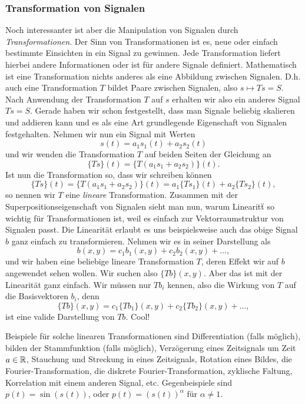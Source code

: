 \subsubsection{Transformation von Signalen}
%
Noch interessanter ist aber die Manipulation von Signalen durch \emph{Transformationen}.
Der Sinn von Transformationen ist es, neue oder einfach bestimmte Einsichten in ein Signal zu gewinnen. 
Jede Transformation liefert hierbei andere Informationen oder ist f\"ur andere Signale definiert.
Mathematisch ist eine Transformation nichts anderes als eine Abbildung zwischen Signalen.
D.h. auch eine Transformation $T$ bildet Paare zwischen Signalen, also $s \mapsto Ts = S$.
Nach Anwendung der Transformation $T$ auf $s$ erhalten wir also ein anderes Signal $Ts = S$.
Gerade haben wir schon festgestellt, dass man Signale beliebig skalieren und addieren kann und es als eine Art grundlegende Eigenschaft von Signalen festgehalten.
Nehmen wir nun ein Signal mit Werten
\[
    s(t) = a_1 s_1(t) + a_2 s_2(t)
\] 
und wir wenden die Transformation $T$ auf beiden Seiten der Gleichung an
\[
    \{Ts\}(t) = \{T (a_1 s_1 + a_2 s_2)\}(t).
\]
Ist nun die Transformation so, dass wir schreiben k\"onnen
\[
    \{Ts\}(t) = \{T (a_1 s_1 + a_2 s_2)\}(t) = a_1 \{Ts_1\}(t) + a_2 \{Ts_2\}(t),
\]
so nennen wir $T$ eine \emph{lineare} Transformation.
Zusammen mit der Superpositionseigenschaft von Signalen sieht man nun, warum Linearit\"t so wichtig f\"ur Transformationen ist, weil es einfach zur Vektorraumstruktur von Signalen passt.
Die Linearit\"at erlaubt es uns beispielsweise auch das obige Signal $b$ ganz einfach zu transformieren.
Nehmen wir es in seiner Darstellung als
\[
    b(x,y) = c_1 b_1(x,y) + c_2 b_2(x,y) + \dots,
\]
und wir haben eine beliebige lineare Transformation $T$, deren Effekt wir auf $b$ angewendet sehen wollen. 
Wir suchen also $\{Tb\}(x,y)$.
Aber das ist mit der Linearit\"at ganz einfach. Wir m\"ussen nur $Tb_i$ kennen, also die Wirkung von $T$ auf die Basisvektoren $b_i$, denn
\[
    \{Tb\}(x,y) = c_1 \{Tb_1\}(x,y) + c_2 \{Tb_2\}(x,y) + \dots,
\]
ist eine valide Darstellung von $Tb$.
Cool!

Beispiele f\"ur solche linearen Transformationen sind Differentiation (falls m\"oglich), bilden der Stammfunktion (falls m\"oglich), Verz\"ogerung eines Zeitsignals um Zeit $a \in \mathbb{R}$, Stauchung und Streckung in eines Zeitsignals, Rotation eines Bildes, die Fourier-Transformation, die diskrete Fourier-Transformation, zyklische Faltung, Korrelation mit einem anderen Signal, etc.
Gegenbeispiele sind $p(t) = \sin(s(t))$, oder $p(t) = (s(t))^\alpha$ f\"ur $\alpha \neq 1$.

